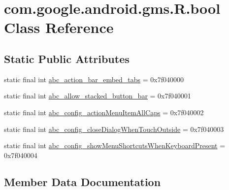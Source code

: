 \hypertarget{classcom_1_1google_1_1android_1_1gms_1_1R_1_1bool}{}\section{com.\+google.\+android.\+gms.\+R.\+bool Class Reference}
\label{classcom_1_1google_1_1android_1_1gms_1_1R_1_1bool}
\subsection*{Static Public Attributes}
\begin{DoxyCompactItemize}
\item 
static final int \mbox{\hyperlink{classcom_1_1google_1_1android_1_1gms_1_1R_1_1bool_aba7b7a104bec17141e784fd384c6e791}{abc\+\_\+action\+\_\+bar\+\_\+embed\+\_\+tabs}} = 0x7f040000
\item 
static final int \mbox{\hyperlink{classcom_1_1google_1_1android_1_1gms_1_1R_1_1bool_a8f7de8abf0731c2c307fcd40f4872050}{abc\+\_\+allow\+\_\+stacked\+\_\+button\+\_\+bar}} = 0x7f040001
\item 
static final int \mbox{\hyperlink{classcom_1_1google_1_1android_1_1gms_1_1R_1_1bool_a0507011114a222b5a5b6335fbf591eae}{abc\+\_\+config\+\_\+action\+Menu\+Item\+All\+Caps}} = 0x7f040002
\item 
static final int \mbox{\hyperlink{classcom_1_1google_1_1android_1_1gms_1_1R_1_1bool_a302e3e67097d4fd3f7893d9df7951be6}{abc\+\_\+config\+\_\+close\+Dialog\+When\+Touch\+Outside}} = 0x7f040003
\item 
static final int \mbox{\hyperlink{classcom_1_1google_1_1android_1_1gms_1_1R_1_1bool_ad58a89e107dec3ba9c78d692e607d4db}{abc\+\_\+config\+\_\+show\+Menu\+Shortcuts\+When\+Keyboard\+Present}} = 0x7f040004
\end{DoxyCompactItemize}


\subsection{Member Data Documentation}
\mbox{\label{classcom_1_1google_1_1android_1_1gms_1_1R_1_1bool_aba7b7a104bec17141e784fd384c6e791}} 
